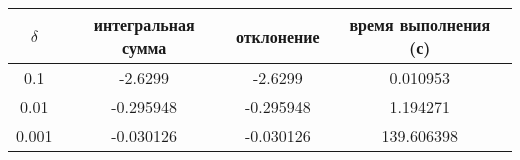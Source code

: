 \begin{tabular}{|c|c|c|c|}
    \hline
    $\delta$ & интегральная сумма & отклонение & время выполнения (с)\\
    \hline
    0.1 & -2.6299 & -2.6299 & 0.010953\\
    \hline
    0.01 & -0.295948 & -0.295948 & 1.194271\\
    \hline
    0.001 & -0.030126 & -0.030126 & 139.606398\\
    \hline
\end{tabular}